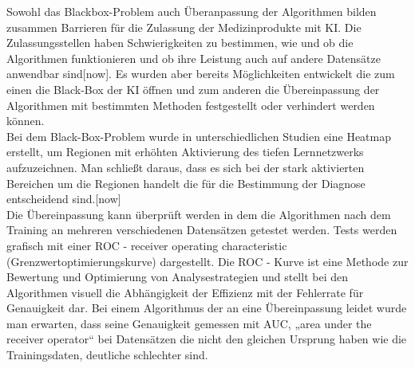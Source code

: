 Sowohl das Blackbox-Problem auch Überanpassung der Algorithmen bilden zusammen Barrieren für die Zulassung der Medizinprodukte mit KI. Die Zulassungsstellen haben Schwierigkeiten zu bestimmen, wie und ob die Algorithmen funktionieren und ob ihre Leistung auch auf andere Datensätze anwendbar sind[now]. Es wurden aber bereits Möglichkeiten entwickelt die zum einen die Black-Box der KI öffnen und zum anderen die Übereinpassung der Algorithmen mit bestimmten Methoden festgestellt oder verhindert werden können. \\

Bei dem Black-Box-Problem wurde in unterschiedlichen Studien eine Heatmap erstellt, um Regionen mit erhöhten Aktivierung des tiefen Lernnetzwerks aufzuzeichnen. Man schließt daraus, dass es sich bei der stark aktivierten Bereichen um die Regionen handelt die für die Bestimmung der Diagnose entscheidend sind.[now] \\
Die Übereinpassung kann überprüft werden in dem die Algorithmen nach dem Training an mehreren verschiedenen Datensätzen getestet werden. Tests werden grafisch mit einer ROC - receiver operating characteristic (Grenzwertoptimierungskurve) dargestellt. Die ROC - Kurve ist eine Methode zur Bewertung und Optimierung von Analysestrategien und stellt bei den Algorithmen visuell die Abhängigkeit der Effizienz mit der Fehlerrate für Genauigkeit dar. Bei einem Algorithmus der an eine Übereinpassung leidet wurde man erwarten, dass seine Genauigkeit gemessen mit AUC, „area under the receiver operator“ bei Datensätzen die nicht den gleichen Ursprung haben wie die Trainingsdaten, deutliche schlechter sind.\\